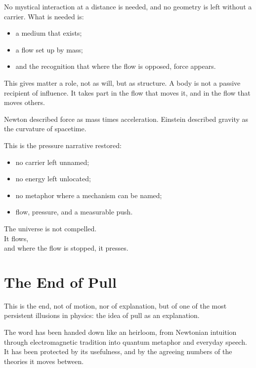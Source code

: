 \documentclass[11pt,a4paper]{article}
\begin{document}
 No mystical interaction at a distance is needed, and no geometry is left without a carrier. What is needed is:
\begin{itemize}
    \item a medium that exists;
    \item a flow set up by mass;
    \item and the recognition that where the flow is opposed, force appears.
\end{itemize}

This gives matter a role, not as will, but as structure. A body is not a passive recipient of influence. It takes part in the flow that moves it, and in the flow that moves others.

Newton described force as mass times acceleration. Einstein described gravity as the curvature of spacetime. 

This is the pressure narrative restored:
\begin{itemize}
    \item no carrier left unnamed;
    \item no energy left unlocated;
    \item no metaphor where a mechanism can be named;
    \item flow, pressure, and a measurable push.
\end{itemize}

The universe is not compelled.\\
It flows,\\
and where the flow is stopped, it presses.

\section{The End of Pull}

This is the end, not of motion, nor of explanation, but of one of the most persistent illusions in physics: the idea of pull as an explanation.

The word has been handed down like an heirloom, from Newtonian intuition through electromagnetic tradition into quantum metaphor and everyday speech. It has been protected by its usefulness, and by the agreeing numbers of the theories it moves between.
\end{document}
